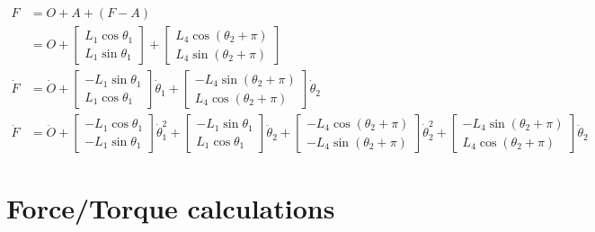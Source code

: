 \documentclass[letterpaper]{article}
\begin{document}
\begin{align}
	F &= O + A + (F-A) \\
	  &= O + \begin{bmatrix} L_1 \cos \theta_1 \\ L_1 \sin \theta_1 \end{bmatrix} + \begin{bmatrix} L_4 \cos(\theta_2 + \pi) \\ L_4 \sin(\theta_2 + \pi) \end{bmatrix} \\
	\dot{F} &= \dot{O} + \begin{bmatrix} -L_1 \sin \theta_1 \\ L_1 \cos \theta_1 \end{bmatrix} \dot{\theta}_1 + \begin{bmatrix} - L_4 \sin(\theta_2 + \pi) \\ L_4 \cos(\theta_2 + \pi) \end{bmatrix} \dot{\theta}_2 \\
	\ddot{F} &= \ddot{O} + \begin{bmatrix} -L_1 \cos \theta_1 \\ -L_1 \sin \theta_1 \end{bmatrix} \dot{\theta}_1^2 
		+ \begin{bmatrix} -L_1 \sin \theta_1 \\ L_1 \cos \theta_1 \end{bmatrix} \ddot{\theta}_2 
		+ \begin{bmatrix} -L_4 \cos(\theta_2 + \pi) \\ -L_4 \sin(\theta_2 + \pi) \end{bmatrix} \dot{\theta}_2^2 
		+ \begin{bmatrix} -L_4 \sin(\theta_2 + \pi) \\ L_4 \cos(\theta_2 + \pi) \end{bmatrix} \ddot{\theta}_2
\end{align}

\section{Force/Torque calculations}
\end{document}
